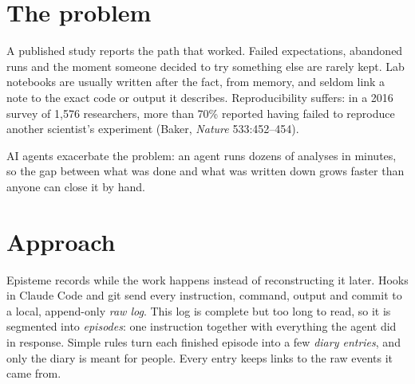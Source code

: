 \documentclass[10pt,twocolumn]{article}
\begin{document}

\section{The problem}
A published study reports the path that worked. Failed expectations, abandoned runs and the moment someone
decided to try something else are rarely kept. Lab notebooks are usually written after the fact, from memory,
and seldom link a note to the exact code or output it describes. Reproducibility suffers: in a 2016 survey of 1{,}576 researchers, more than 70\% reported
having failed to reproduce another scientist's experiment (Baker, \emph{Nature} 533:452--454).

AI agents exacerbate the problem: an agent runs dozens of analyses in minutes, so the gap between what was done
and what was written down grows faster than anyone can close it by hand.

\section{Approach}
Episteme records while the work happens instead of reconstructing it later. Hooks in Claude Code and git send
every instruction, command, output and commit to a local, append-only \emph{raw log}. This log is complete but
too long to read, so it is segmented into \emph{episodes}: one instruction together with everything the agent
did in response. Simple rules turn each finished episode into a few \emph{diary entries}, and only the diary is
meant for people. Every entry keeps links to the raw events it came from.
\end{document}
